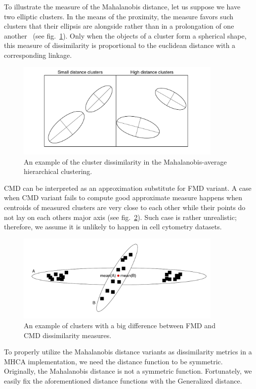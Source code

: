 To illustrate the measure of the Mahalanobis distance, let us suppose we have two elliptic clusters. In the means of the proximity, the measure favors such clusters that their ellipsis are alongside rather than in a prolongation of one another~\cite{dagnelie1991using} (see fig.~\ref{fig01:ellipses}). Only when the objects of a cluster form a spherical shape, this measure of dissimilarity is proportional to the euclidean distance with a corresponding linkage.

\begin{figure}\centering
	\includegraphics[width=10cm]{img/ellipses}
	\caption{An example of the cluster dissimilarity in the Mahalanobis-average hierarchical clustering.}
	\label{fig01:ellipses}
\end{figure}


CMD can be interpreted as an approximation substitute for FMD variant. A case when CMD variant fails to compute good approximate measure happens when centroids of measured clusters are very close to each other while their points do not lay on each others major axis (see fig.~\ref{fig01:maha_var}). Such case is rather unrealistic; therefore, we assume it is unlikely to happen in cell cytometry datasets.

\begin{figure}\centering
	\includegraphics[width=10cm]{img/maha_variant}
	\caption{An example of clusters with a big difference between FMD and CMD dissimilarity measures.}
	\label{fig01:maha_var}
\end{figure}

To properly utilize the Mahalanobis distance variants as dissimilarity metrics in a MHCA implementation, we need the distance function to be symmetric. Originally, the Mahalanobis distance is not a symmetric function. Fortunately, we easily fix the aforementioned distance functions with the Generalized distance.

